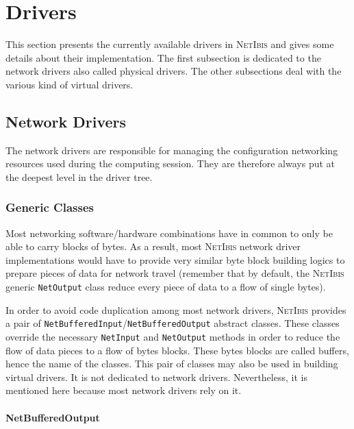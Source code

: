 \documentclass[11pt]{book}
\def\NetIbis{\textsc{NetIbis}\xspace}
\begin{document}
\section{Drivers}
\label{sec:drivers}

This section presents the currently available drivers in \NetIbis and
gives some details about their implementation. The first subsection is
dedicated to the network drivers also called physical drivers. The
other subsections deal with the various kind of virtual drivers.

\subsection{Network Drivers}
\label{sec:network-drivers}

The network drivers are responsible for managing the configuration networking
resources used during the computing session. They are therefore always
put at the deepest level in the driver tree.

%
\subsubsection{Generic Classes}
\label{sec:generic-classes}

Most networking software/hardware combinations have in common to only
be able to carry blocks of bytes. As a result, most \NetIbis network
driver implementations would have to provide very similar byte block
building logics to prepare pieces of data for network travel (remember
that by default, the \NetIbis generic \texttt{NetOutput} class reduce
every piece of data to a flow of single bytes).

In order to avoid code duplication among most network drivers,
\NetIbis provides a pair of
\texttt{NetBufferedInput}/\texttt{NetBufferedOutput} abstract classes.
These classes override the necessary \texttt{NetInput} and
\texttt{NetOutput} methods in order to reduce the flow of data pieces
to a flow of bytes blocks. These bytes blocks are called buffers,
hence the name of the classes. This pair of classes may also be used
in building virtual drivers. It is not dedicated to network drivers.
Nevertheless, it is mentioned here because most network drivers rely
on it.


\paragraph{NetBufferedOutput}
\label{sec:netbufferedoutput}
\end{document}
